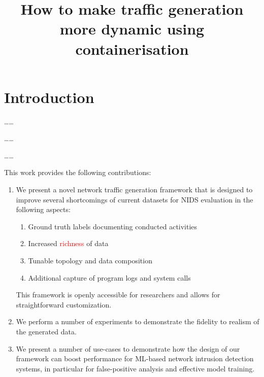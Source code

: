 \documentclass{article}
\begin{document}
\title{How to make traffic generation more dynamic using containerisation}


\maketitle

\section{Introduction}


\dots \dots

\dots \dots

\dots \dots

This work provides the following contributions:

\begin{enumerate}
\item We present a novel network traffic generation framework that is designed to improve several shortcomings of current datasets for NIDS evaluation in the following aspects:
\begin{enumerate}
\item Ground truth labels documenting conducted activities
\item Increased \textcolor{red}{richness} of data
\item Tunable topology and data composition
\item Additional capture of program logs and system calls
\end{enumerate}
This framework is openly accessible for researchers and allows for straightforward customization.
 
\item We perform a number of experiments to demonstrate the fidelity to realism of the generated data.
\item We present a number of use-cases to demonstrate how the design of our framework can boost performance for ML-based network intrusion detection systems, in particular for false-positive analysis and effective model training.
\end{enumerate}
\end{document}
